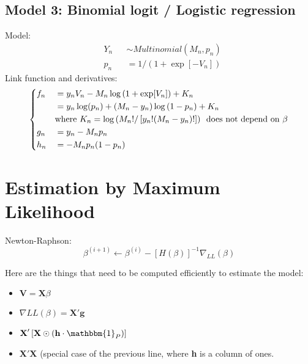 \documentclass[12pt]{article}
\begin{document}
\subsection{Model 3: Binomial logit / Logistic regression}
Model:
\begin{equation}
\begin{aligned}
	& Y_n && \sim Multinomial(M_n, p_n) \\
	& p_n && = 1 / \left( 1 + \exp[-V_n] \right)
\end{aligned}
\end{equation}
Link function and derivatives:
\begin{equation}
\left\{ \begin{aligned}
	& f_n && =  y_n V_n - M_n \log\left( 1 + \exp[V_n] \right) + K_n \\
	&  && =  y_n \log(p_n) + (M_n - y_n) \log\left( 1 - p_n \right) + K_n \\
		& && \text{where } K_n = \log\left( M_n ! / \left[ y_n ! (M_n - y_n)! \right] \right) \hspace*{5pt} \text{does not depend on } \beta \\
	& g_n && =  y_n - M_n p_n \\
	& h_n && =  - M_n p_n (1-p_n) \\
\end{aligned} \right.
\end{equation}

\section{Estimation by Maximum Likelihood}
Newton-Raphson:
\begin{equation}
	\beta^{(i+1)} \leftarrow \beta^{(i)} - \left[H(\beta)\right]^{-1} \nabla_{LL}(\beta)
\end{equation}

Here are the things that need to be computed efficiently to estimate the model:
\begin{itemize}
	\item $\textbf{V} = \textbf{X} \beta $
	\item $\nabla LL(\beta) = \textbf{X}' \textbf{g}$
	\item $\textbf{X}' \left[ \textbf{X} \odot \left(\textbf{h} \cdot \mathbbm{1}_P \right) \right]$
	\item $\textbf{X}' \textbf{X} $ (special case of the previous line, where \textbf{h} is a column of ones.
\end{itemize}
\end{document}
